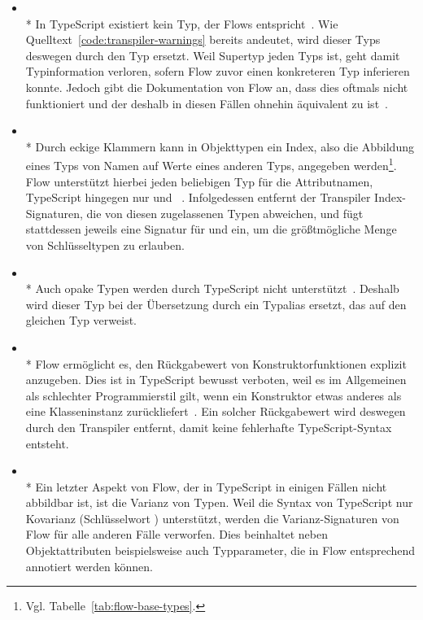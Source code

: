 \begin{itemize}
  \item {}\\*
    In TypeScript existiert kein Typ, der Flows  entspricht~\autocite{TS:GITHUB:NO_EXISTENTIAL_TYPE}. Wie Quelltext~\ref{code:transpiler-warnings} bereits andeutet, wird dieser Typs deswegen durch den Typ  ersetzt. Weil  Supertyp jeden Typs ist, geht damit Typinformation verloren, sofern Flow zuvor einen konkreteren Typ inferieren konnte. Jedoch gibt die Dokumentation von Flow an, dass dies oftmals nicht funktioniert und der  deshalb in diesen Fällen ohnehin äquivalent zu  ist~\autocite{FLOW:LINT_RULE_REFERENCE}.
  \medbreak
  \item {}\\*
    Durch eckige Klammern kann in Objekttypen ein Index, also die Abbildung eines Typs von Namen auf Werte eines anderen Typs, angegeben werden\footnote{Vgl. Tabelle~\ref{tab:flow-base-types}.}. Flow unterstützt hierbei jeden beliebigen Typ für die Attributnamen, TypeScript hingegen nur  und ~\autocite{TS:HANDBOOK:INTERFACES}. Infolgedessen entfernt der Transpiler Index-Signaturen, die von diesen zugelassenen Typen abweichen, und fügt stattdessen jeweils eine Signatur für  und  ein, um die größtmögliche Menge von Schlüsseltypen zu erlauben.
  \medbreak
  \item {}\\*
    Auch opake Typen werden durch TypeScript nicht unterstützt~\autocite{TS:GITHUB:NO_OPAQUE_TYPE}. Deshalb wird dieser Typ bei der Übersetzung durch ein Typalias ersetzt, das auf den gleichen Typ verweist.
  \medbreak
  \item {}\\*
    Flow ermöglicht es, den Rückgabewert von Konstruktorfunktionen explizit anzugeben. Dies ist in TypeScript bewusst verboten, weil es im Allgemeinen als schlechter Programmierstil gilt, wenn ein Konstruktor etwas anderes als eine Klasseninstanz zurückliefert~\autocite{TS:GITHUB:CONSTRUCTOR_RETURN_TYPE}. Ein solcher Rückgabewert wird deswegen durch den Transpiler entfernt, damit keine fehlerhafte TypeScript-Syntax entsteht.
  \medbreak
  \item {}\\*
    Ein letzter Aspekt von Flow, der in TypeScript in einigen Fällen nicht abbildbar ist, ist die Varianz von Typen. Weil die Syntax von TypeScript nur Kovarianz (Schlüsselwort ) unterstützt, werden die Varianz-Signaturen von Flow für alle anderen Fälle verworfen. Dies beinhaltet neben Objektattributen beispielsweise auch Typparameter, die in Flow entsprechend annotiert werden können.
\end{itemize}

